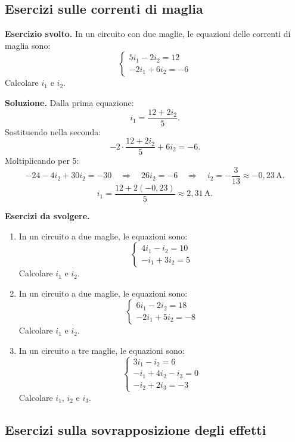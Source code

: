 \subsection{Esercizi sulle correnti di maglia}

\begin{esercizio}
\textbf{Esercizio svolto.} In un circuito con due maglie, le equazioni delle correnti di maglia sono:
\[
\begin{cases}
5 i_1 - 2 i_2 = 12 \\
-2 i_1 + 6 i_2 = -6
\end{cases}
\]
Calcolare \(i_1\) e \(i_2\).

\smallskip
\textbf{Soluzione.} Dalla prima equazione:
\[
i_1 = \frac{12 + 2 i_2}{5}.
\]
Sostituendo nella seconda:
\[
-2 \cdot \frac{12 + 2 i_2}{5} + 6 i_2 = -6.
\]
Moltiplicando per 5:
\[
-24 - 4 i_2 + 30 i_2 = -30 \quad\Rightarrow\quad 26 i_2 = -6 \quad\Rightarrow\quad i_2 = -\frac{3}{13} \approx -0{,}23\,\text{A}.
\]
\[
i_1 = \frac{12 + 2(-0{,}23)}{5} \approx 2{,}31\,\text{A}.
\]
\end{esercizio}

\textbf{Esercizi da svolgere.}
\begin{enumerate}[leftmargin=1cm]
  \item In un circuito a due maglie, le equazioni sono:
  \[
  \begin{cases}
  4 i_1 - i_2 = 10 \\
  -i_1 + 3 i_2 = 5
  \end{cases}
  \]
  Calcolare \(i_1\) e \(i_2\).
  \item In un circuito a due maglie, le equazioni sono:
  \[
  \begin{cases}
  6 i_1 - 2 i_2 = 18 \\
  -2 i_1 + 5 i_2 = -8
  \end{cases}
  \]
  Calcolare \(i_1\) e \(i_2\).
  \item In un circuito a tre maglie, le equazioni sono:
  \[
  \begin{cases}
  3 i_1 - i_2 = 6 \\
  -i_1 + 4 i_2 - i_3 = 0 \\
  -i_2 + 2 i_3 = -3
  \end{cases}
  \]
  Calcolare \(i_1\), \(i_2\) e \(i_3\).
\end{enumerate}

\subsection{Esercizi sulla sovrapposizione degli effetti}

